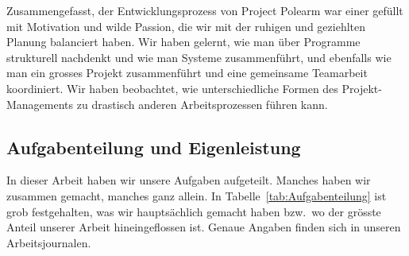 \documentclass[../Main.tex]{subfiles}
\begin{document}
Zusammengefasst, der Entwicklungsprozess von Project Polearm war einer gefüllt mit Motivation und wilde Passion, die wir mit der ruhigen und geziehlten Planung balanciert haben. Wir haben gelernt, wie man über Programme strukturell nachdenkt und wie man Systeme zusammenführt, und ebenfalls wie man ein grosses Projekt zusammenführt und eine gemeinsame Teamarbeit koordiniert. Wir haben beobachtet, wie unterschiedliche Formen des Projekt-Managements zu drastisch anderen Arbeitsprozessen führen kann.

\subsection{Aufgabenteilung und Eigenleistung} \label{sec:Aufgabenteilung}

In dieser Arbeit haben wir unsere Aufgaben aufgeteilt. Manches haben wir zusammen gemacht, manches ganz allein. In Tabelle~\ref{tab:Aufgabenteilung} ist grob festgehalten, was wir hauptsächlich gemacht haben bzw.\ wo der grösste Anteil unserer Arbeit hineingeflossen ist. Genaue Angaben finden sich in unseren Arbeitsjournalen.
\end{document}
